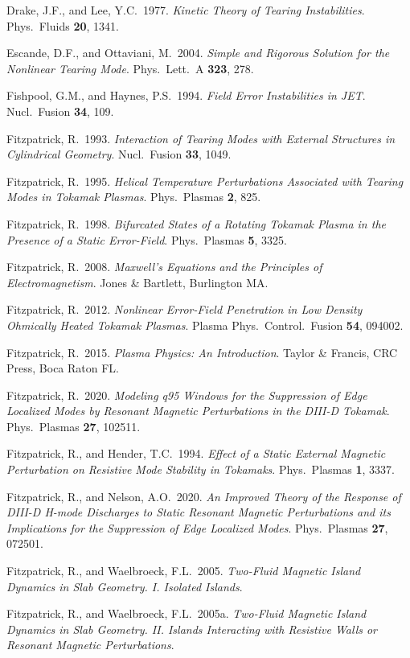 \documentclass[notitlepage,12pt]{article}
\begin{document}
\begin{description}
\item Drake, J.F., and Lee, Y.C.\ 1977. {\em Kinetic Theory of Tearing Instabilities}. Phys.\ Fluids {\bf 20}, 1341.
\item Escande, D.F., and Ottaviani, M.\ 2004. {\em Simple and Rigorous Solution for the Nonlinear Tearing Mode}. Phys.\ Lett.\ A {\bf 323}, 278. 
\item Fishpool, G.M., and Haynes, P.S.\ 1994. {\em Field Error Instabilities in JET}. Nucl.\ Fusion {\bf 34}, 109. 
\item Fitzpatrick, R.\ 1993. {\em Interaction of Tearing Modes with External Structures in Cylindrical Geometry}. Nucl.\ Fusion {\bf 33}, 1049. 
\item Fitzpatrick, R.\ 1995. {\em Helical Temperature Perturbations Associated with Tearing Modes in Tokamak Plasmas}. Phys.\ Plasmas {\bf 2}, 825. 
\item Fitzpatrick, R.\ 1998. {\em Bifurcated States of a Rotating Tokamak Plasma in the Presence of a Static Error-Field}. Phys.\ Plasmas {\bf 5}, 3325. 
\item Fitzpatrick, R.\ 2008. {\em Maxwell's Equations and the Principles of Electromagnetism}. Jones \& Bartlett, Burlington MA.
\item Fitzpatrick, R.\ 2012. {\em Nonlinear Error-Field Penetration in Low Density Ohmically Heated Tokamak Plasmas}. Plasma Phys.\ Control.\ Fusion {\bf 54}, 094002.
\item Fitzpatrick, R.\ 2015. {\em Plasma Physics: An Introduction}. Taylor \& Francis, CRC Press, Boca Raton FL.
\item Fitzpatrick, R.\ 2020. {\em Modeling q95 Windows for the Suppression of Edge Localized Modes by Resonant Magnetic Perturbations in the DIII-D Tokamak}. Phys.\ Plasmas {\bf 27}, 102511.
\item Fitzpatrick, R., and Hender, T.C.\ 1994. {\em Effect of a Static External Magnetic Perturbation on Resistive Mode Stability in Tokamaks}. Phys.\ Plasmas {\bf 1}, 3337. 
\item Fitzpatrick, R., and Nelson, A.O.\ 2020. {\em An Improved Theory of the Response of DIII-D H-mode Discharges to Static Resonant Magnetic Perturbations and its Implications for the Suppression of Edge Localized Modes}. Phys.\ Plasmas {\bf 27}, 072501.
\item Fitzpatrick, R., and Waelbroeck, F.L.\ 2005. {\em Two-Fluid Magnetic Island Dynamics in Slab Geometry. I. Isolated Islands}.
\item Fitzpatrick, R., and Waelbroeck, F.L.\ 2005a. {\em Two-Fluid Magnetic Island Dynamics in Slab Geometry. II. Islands Interacting with Resistive Walls or Resonant Magnetic Perturbations}.

\end{description}
\end{document}
